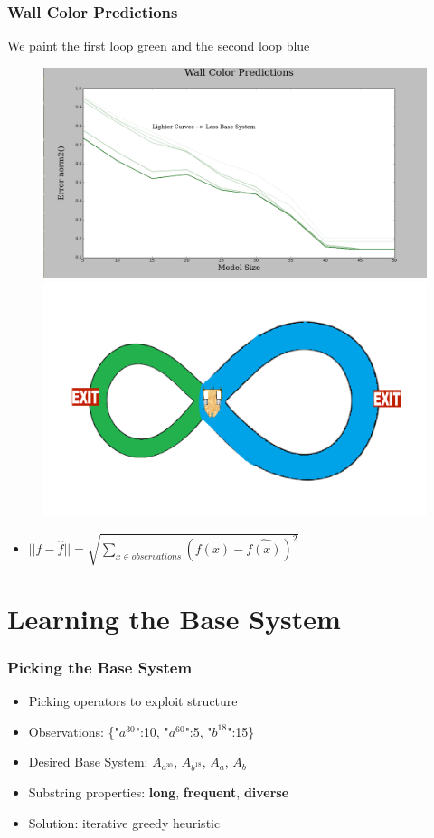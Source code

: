 \documentclass{beamer}
\begin{document}
\begin{frame}
\frametitle{Wall Color Predictions}
We paint the first loop green and the second loop blue
\begin{figure}
\includegraphics[width=0.6\linewidth]{lucasplots/monImages/WallColorPredictions.png}
\includegraphics[width=0.4\linewidth]{lucasplots/monImages/doubleLoopImageMO.png}

\end{figure}

\begin{itemize}

\item $||f - \hat{f}|| = \sqrt{\sum\nolimits_{x \in observations}(f(x) - \hat{f(x)})^2}$ 
\end{itemize}

\end{frame}



\section{Learning the Base System}

\begin{frame}
\frametitle{Picking the Base System}
\begin{itemize}


\item Picking operators to exploit structure
\item[] Observations: \{"$a^{30}$":10, "$a^{60}$":5, "$b^{18}$":15\}

\item[] Desired Base System: $A_{a^{30}}$, $A_{b^{18}}$, $A_a$, $A_b$

\item Substring properties: 
\textbf{long}, \textbf{frequent}, \textbf{diverse}

\item Solution: iterative greedy heuristic 


\end{itemize}
\end{frame}
\end{document}
